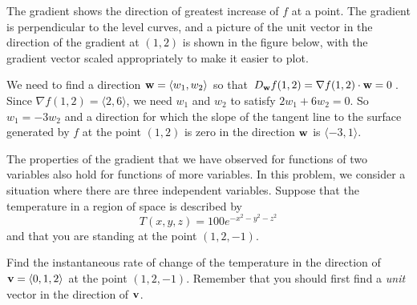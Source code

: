 \begin{exercises}
\begin{exerciseSolution}
	\item The gradient shows the direction of greatest increase of $f$ at a point. The gradient is perpendicular to the level curves, and a picture of the unit vector in the direction of the gradient at $(1,2)$ is shown in the figure below, with the gradient vector scaled appropriately to make it easier to plot.  
\begin{center}
\end{center}

	\item We need to find a direction $\mathbf{w} = \langle w_1, w_2 \rangle$ so that $D_{\mathbf{w}} f(1,2) = \nabla f(1,2) \cdot \mathbf{w} = 0$. Since $\nabla f (1,2)= \langle 2, 6 \rangle$, we need $w_1$ and $w_2$ to satisfy $2w_1+6w_2=0$. So $w_1=-3w_2$ and a direction for which the slope of the tangent line to the surface generated by $f$ at the point $(1,2)$ is zero in the direction $\mathbf{w}$ is $\langle -3,1 \rangle$. 

\ea

\end{exerciseSolution}


\item The properties of the gradient that we have observed for functions of two variables also hold for functions of more variables.  In this problem, we consider a situation where there are three independent variables.  Suppose that the temperature in a region of space is described by
  $$
  T(x,y,z) = 100e^{-x^2-y^2-z^2}
  $$
  and that you are standing at the point $(1,2,-1)$.
  \ba
\item Find the instantaneous rate of change of the temperature in the direction of
  $\mathbf{v}=\langle 0, 1, 2\rangle$ at the point $(1,2,-1)$.  Remember that you should first find a
  {\em unit} vector in the direction of $\mathbf{v}$.


\end{exercises}
